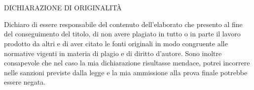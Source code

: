 \chapter*{}
\thispagestyle{empty} %
DICHIARAZIONE DI ORIGINALITÀ

Dichiaro di essere responsabile del contenuto dell'elaborato che presento al fine del conseguimento del titolo, di non avere plagiato in tutto o in parte il lavoro prodotto da altri e di aver citato le fonti originali in modo congruente alle normative vigenti in materia di plagio e di diritto d'autore.
Sono inoltre consapevole che nel caso la mia dichiarazione risultasse mendace, potrei incorrere nelle sanzioni previste dalla legge e la mia ammissione alla prova finale potrebbe essere negata.
